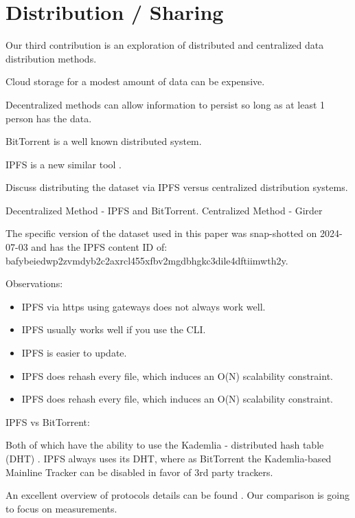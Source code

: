 \documentclass[10pt,twocolumn,letterpaper]{article}
\begin{document}
\section{Distribution / Sharing}


Our third contribution is an exploration of distributed and centralized data distribution methods. 

Cloud storage for a modest amount of data can be expensive.

Decentralized methods can allow information to persist so long as at least 1
person has the data.

BitTorrent is a well known distributed system.

IPFS is a new similar tool \cite{benet_ipfs_2014,bieri_overview_2021}.


Discuss distributing the dataset via IPFS versus centralized distribution
systems.

Decentralized Method - IPFS and BitTorrent.
Centralized Method - Girder


The specific version of the dataset used in this paper was snap-shotted on
2024-07-03 and has the IPFS content ID of:
bafybeiedwp2zvmdyb2c2axrcl455xfbv2mgdbhgkc3dile4dftiimwth2y.

Observations:
\begin{itemize}
    \item IPFS via https using gateways does not always work well.
    \item IPFS usually works well if you use the CLI.
    \item IPFS is easier to update.
    \item IPFS does rehash every file, which induces an O(N) scalability constraint.
    \item IPFS does rehash every file, which induces an O(N) scalability constraint.
\end{itemize}


IPFS vs BitTorrent:

Both of which have the ability to use the Kademlia - distributed hash table (DHT) \cite{maymounkov_kademlia_2002}.
IPFS always uses its DHT, where as BitTorrent the Kademlia-based Mainline
Tracker can be disabled in favor of 3rd party trackers.

An excellent overview of protocols details can be found \cite{zebedee_comparing_2023}.
Our comparison is going to focus on measurements.
\end{document}
